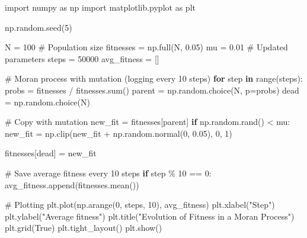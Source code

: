\documentclass[
  letterpaper,
  DIV=11,
  numbers=noendperiod]{scrreprt}
\newenvironment{Shaded}{\begin{snugshade}}{\end{snugshade}}
\newcommand{\BuiltInTok}[1]{\textcolor[rgb]{0.00,0.23,0.31}{#1}}
\newcommand{\CommentTok}[1]{\textcolor[rgb]{0.37,0.37,0.37}{#1}}
\newcommand{\ControlFlowTok}[1]{\textcolor[rgb]{0.00,0.23,0.31}{\textbf{#1}}}
\newcommand{\DecValTok}[1]{\textcolor[rgb]{0.68,0.00,0.00}{#1}}
\newcommand{\FloatTok}[1]{\textcolor[rgb]{0.68,0.00,0.00}{#1}}
\newcommand{\ImportTok}[1]{\textcolor[rgb]{0.00,0.46,0.62}{#1}}
\newcommand{\KeywordTok}[1]{\textcolor[rgb]{0.00,0.23,0.31}{\textbf{#1}}}
\newcommand{\NormalTok}[1]{\textcolor[rgb]{0.00,0.23,0.31}{#1}}
\newcommand{\OperatorTok}[1]{\textcolor[rgb]{0.37,0.37,0.37}{#1}}
\newcommand{\StringTok}[1]{\textcolor[rgb]{0.13,0.47,0.30}{#1}}
\newcommand{\VariableTok}[1]{\textcolor[rgb]{0.07,0.07,0.07}{#1}}
\theoremstyle{definition}
\theoremstyle{remark}
\begin{document}
\begin{Shaded}
\begin{Highlighting}[]
\ImportTok{import}\NormalTok{ numpy }\ImportTok{as}\NormalTok{ np}
\ImportTok{import}\NormalTok{ matplotlib.pyplot }\ImportTok{as}\NormalTok{ plt}

\NormalTok{np.random.seed(}\DecValTok{5}\NormalTok{)}

\NormalTok{N }\OperatorTok{=} \DecValTok{100} \CommentTok{\# Population size }
\NormalTok{fitnesses }\OperatorTok{=}\NormalTok{ np.full(N, }\FloatTok{0.05}\NormalTok{)}
\NormalTok{mu }\OperatorTok{=} \FloatTok{0.01}
\CommentTok{\# Updated parameters}
\NormalTok{steps }\OperatorTok{=} \DecValTok{50000}
\NormalTok{avg\_fitness }\OperatorTok{=}\NormalTok{ []}

\CommentTok{\# Moran process with mutation (logging every 10 steps)}
\ControlFlowTok{for}\NormalTok{ step }\KeywordTok{in} \BuiltInTok{range}\NormalTok{(steps):}
\NormalTok{    probs }\OperatorTok{=}\NormalTok{ fitnesses }\OperatorTok{/}\NormalTok{ fitnesses.}\BuiltInTok{sum}\NormalTok{()}
\NormalTok{    parent }\OperatorTok{=}\NormalTok{ np.random.choice(N, p}\OperatorTok{=}\NormalTok{probs)}
\NormalTok{    dead }\OperatorTok{=}\NormalTok{ np.random.choice(N)}

    \CommentTok{\# Copy with mutation}
\NormalTok{    new\_fit }\OperatorTok{=}\NormalTok{ fitnesses[parent]}
    \ControlFlowTok{if}\NormalTok{ np.random.rand() }\OperatorTok{\textless{}}\NormalTok{ mu:}
\NormalTok{        new\_fit }\OperatorTok{=}\NormalTok{ np.clip(new\_fit }\OperatorTok{+}\NormalTok{ np.random.normal(}\DecValTok{0}\NormalTok{, }\FloatTok{0.05}\NormalTok{), }\DecValTok{0}\NormalTok{, }\DecValTok{1}\NormalTok{)}
            
\NormalTok{    fitnesses[dead] }\OperatorTok{=}\NormalTok{ new\_fit}

    \CommentTok{\# Save average fitness every 10 steps}
    \ControlFlowTok{if}\NormalTok{ step }\OperatorTok{\%} \DecValTok{10} \OperatorTok{==} \DecValTok{0}\NormalTok{:}
\NormalTok{        avg\_fitness.append(fitnesses.mean())}

\CommentTok{\# Plotting}
\NormalTok{plt.plot(np.arange(}\DecValTok{0}\NormalTok{, steps, }\DecValTok{10}\NormalTok{), avg\_fitness)}
\NormalTok{plt.xlabel(}\StringTok{"Step"}\NormalTok{)}
\NormalTok{plt.ylabel(}\StringTok{"Average fitness"}\NormalTok{)}
\NormalTok{plt.title(}\StringTok{"Evolution of Fitness in a Moran Process"}\NormalTok{)}
\NormalTok{plt.grid(}\VariableTok{True}\NormalTok{)}
\NormalTok{plt.tight\_layout()}
\NormalTok{plt.show()}
\end{Highlighting}
\end{Shaded}
\end{document}
